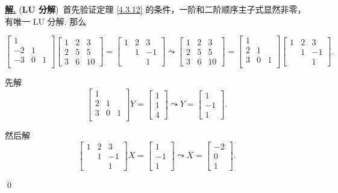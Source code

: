 \documentclass[10pt,openany]{article}
\theoremstyle{thmstyle} %
\theoremstyle{defstyle} %
\theoremstyle{prostyle} %
\theoremstyle{exastyle}
\theoremstyle{remstyle}
\newenvironment{solution}{\par\underline{\textbf{解.}} \;\fangsong}{\qed\par}
\begin{document}
\begin{solution}
	(\textbf{LU 分解})\ 首先验证定理 \ref{4.3.12} 的条件，一阶和二阶顺序主子式显然非零，有唯一 LU 分解. 那么
	
	\[ \begin{bmatrix}
		1 & & \\
		-2 & 1 & \\
		-3 & 0 & 1 \\
	\end{bmatrix}\begin{bmatrix}
	1 & 2 & 3 \\
	2 & 5 & 5 \\
	3 & 6 & 10
	\end{bmatrix}=\begin{bmatrix}
	1 & 2 & 3 \\
	 & 1 & -1 \\
	 &  & 1
	\end{bmatrix} \leadsto \begin{bmatrix}
	1 & 2 & 3 \\
	2 & 5 & 5 \\
	3 & 6 & 10
	\end{bmatrix} = \begin{bmatrix}
	1 & & \\
	2 & 1 & \\
	3 & 0 & 1 \\
	\end{bmatrix}\begin{bmatrix}
	1 & 2 & 3 \\
	 & 1 & -1 \\
	 &  & 1
	\end{bmatrix}. \]
	
	先解
	\[ \begin{bmatrix}
		1 & & \\
		2 & 1 & \\
		3 & 0 & 1 \\
	\end{bmatrix}Y=\begin{bmatrix}
	1 \\ 1 \\ 4
	\end{bmatrix} \leadsto Y=\begin{bmatrix}
	1 \\ -1 \\ 1
	\end{bmatrix}. \]
	
	然后解
	\[ \begin{bmatrix}
		1 & 2 & 3 \\
		& 1 & -1 \\
		&  & 1
	\end{bmatrix}X=\begin{bmatrix}
	1 \\ -1 \\ 1
	\end{bmatrix} \leadsto X=\begin{bmatrix}
	-2 \\ 0 \\ 1
	\end{bmatrix}. \]
	

\end{solution}
\end{document}
